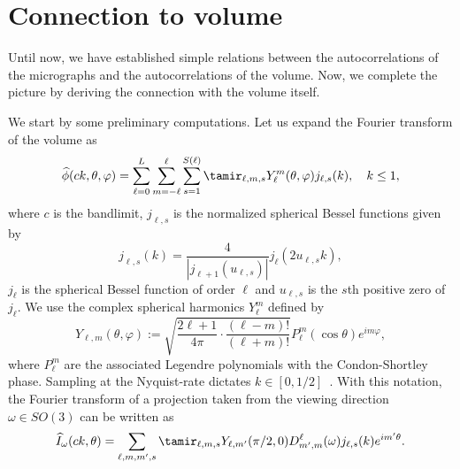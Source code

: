 \documentclass[9pt,twocolumn,twoside,lineno]{pnas-new}
\begin{document}
\section{Connection to volume}

Until now, we have established  simple relations between the autocorrelations of the micrographs and the autocorrelations of the volume. Now, we complete the picture by deriving the connection with the volume itself.

We start by some preliminary computations. Let us  expand the Fourier transform of the volume as
\begin{equation} \label{eq:volume_expansion_app} 
\widehat \phi(ck, \theta, \varphi) = \sum_{\ell = 0}^L\sum_{m=-\ell}^{\ell}\sum_{s=1}^{S(\ell)}\tamir_{\ell, m, s}Y_{\ell}^m(\theta,\varphi)j_{\ell,s}(k), \quad k\leq 1,
\end{equation}
where $c$ is the bandlimit, $j_{\ell,s}$ is the normalized spherical Bessel functions given by
\[ j_{\ell, s}(k) = \frac{4}{|j_{\ell+1}(u_{\ell, s})|}j_{\ell}(2u_{\ell,s} k),\]
$j_{\ell}$ is the spherical Bessel function of order $\ell$ and  $u_{\ell,s}$ is the $s$th positive zero of $j_{\ell}$. We use 
the complex spherical harmonics $Y_{\ell}^m$ defined by  
\[ Y_{\ell,m}(\theta,\varphi) := \sqrt{\frac{2\ell+1}{4\pi}\cdot\frac{(\ell-m)!}{(\ell+m)!}}P_{\ell}^m(\cos\theta)e^{i m\varphi},\]
where $P_{\ell}^m$ are the associated Legendre polynomials with the Condon-Shortley phase. 
Sampling at the Nyquist-rate dictates $k\in[0,1/2]$~\cite{levin20173d}.  With this notation, 
the Fourier transform of a  projection taken from the viewing direction $\omega\in SO(3)$ can be written as 
\[ \widehat I_{\omega}(ck,\theta) = \sum_{\ell,m,m',s}\tamir_{\ell,m,s}Y_{\ell,m'}(\pi/2,0)D_{m',m}^{\ell}(\omega)j_{\ell,s}(k)e^{im'\theta}.\]
\end{document}
